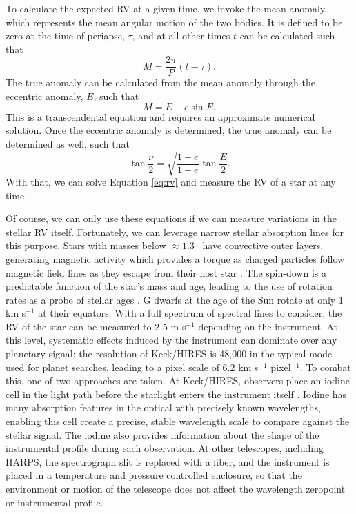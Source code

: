 To calculate the expected RV at a given time, we invoke the mean anomaly, which represents the mean angular motion of the 
two bodies. 
It is defined to be zero at the time of periapse, $\tau$, and at all other times $t$ can 
be calculated such that
\begin{equation}
M = \frac{2\pi}{P}(t-\tau).
\end{equation}
The true anomaly can be calculated from the mean anomaly through the eccentric anomaly, 
$E$, such that
\begin{equation}
M = E - e \sin E.
\end{equation}
This is a transcendental equation and requires an approximate numerical solution.
Once the eccentric anomaly is determined, the true anomaly can be determined as well,
such that
\begin{equation}
\tan \frac{\nu}{2} = \sqrt{\frac{1+e}{1-e}} \tan \frac{E}{2}.
\end{equation}
With that, we can solve Equation \ref{eq:rv} and measure the RV of a star at any time.

Of course, we can only use these equations if we can measure variations in the stellar RV
itself.
Fortunately, we can leverage narrow stellar absorption lines for this purpose.
Stars with masses below $\approx 1.3$ \msun\ have convective outer layers, generating
magnetic activity which provides a torque as charged particles follow magnetic
field lines as they escape from their host star \citep{Shu94}.
The spin-down is a predictable function of the star's mass and age, leading to the use
of rotation rates as a probe of stellar ages \citep{Barnes03}.
G dwarfs at the age of the Sun rotate at only 1 km s$^{-1}$ at their equators.
With a full spectrum of spectral lines to consider, the RV of the star can be 
measured to 2-5 m s$^{-1}$ depending on the instrument.
At this level, systematic effects induced by the instrument can dominate over any planetary
signal: the resolution of Keck/HIRES is 48,000 in the typical mode used for planet searches,
leading to a pixel scale of 6.2 km s$^{-1}$ pixel$^{-1}$.
To combat this, one of two approaches are taken.
At Keck/HIRES, observers place an iodine cell in the light path before the starlight
enters the instrument itself \citep{Butler96}.
Iodine has many absorption features in the optical with precisely known wavelengths,
enabling this cell create a precise, stable wavelength scale to compare against the stellar
signal. 
The iodine also provides information about the shape of the instrumental profile during
each observation.
At other telescopes, including HARPS, the spectrograph slit is replaced with a fiber,
and the instrument is placed in a temperature and pressure controlled enclosure, so that
the environment or motion of the telescope does not affect the wavelength zeropoint or
instrumental profile.



